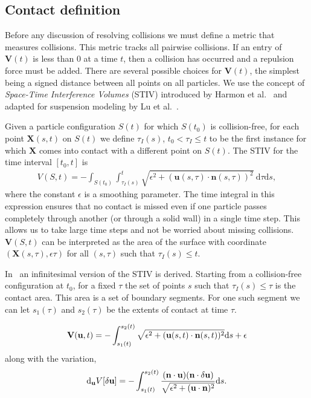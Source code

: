 \documentclass[preprint, 10pt]{elsarticle}
\begin{document}
\subsection{Contact definition}

Before any discussion of resolving collisions we must define a metric
that measures collisions. This metric tracks all pairwise collisions. If
an entry of $\mathbf{V}(t)$ is less than 0 at a time $t$, then a
collision has occurred and a repulsion force must be added. There are
several possible choices for $\mathbf{V}(t)$, the simplest being a
signed distance between all points on all particles. We use the concept
of {\em Space-Time Interference Volumes} (STIV) introduced by Harmon et
al.~\cite{Harmon2011} and adapted for suspension modeling by Lu et
al.~\cite{Lu2017}. 

Given a particle configuration $S(t)$ for which $S(t_0)$ is
collision-free, for each point $\mathbf{X}(s,t)$ on $S(t)$ we define
$\tau_I(s)$, $t_0 < \tau_I \leq t$ to be the first instance for which
$\mathbf{X}$ comes into contact with a different point on $S(t)$. The
STIV for the time interval $[t_0, t]$ is 
\begin{align*}
    V(S, t) = -\int_{S(t_0)}\int_{\tau_I(s)}^t 
    \sqrt{\epsilon^2 + (\mathbf{u}(s, \tau) \cdot
    \mathbf{n}(s,\tau))^2}~\text{d}\tau\text{d}s,
\end{align*}
where the constant $\epsilon$ is a smoothing parameter. The time
integral in this expression ensures that no contact is missed even if
one particle passes completely through another (or through a solid wall)
in a single time step. This allows us to take large time steps and not
be worried about missing collisions. $\mathbf{V}(S,t)$ can be
interpreted as the area of the surface with coordinate
$(\mathbf{X}(s,\tau),\epsilon\tau)$ for all $(s,\tau)$ such that
$\tau_I(s)\leq t$. 

In~\cite{Lu2017} an infinitesimal version of the STIV is derived.
Starting from a collision-free configuration at $t_0$, for a fixed
$\tau$ the set of points $s$ such that $\tau_I(s)\leq \tau$ is the
contact area. This area is a set of boundary segments. For one such
segment we can let $s_1(\tau)$ and $s_2(\tau)$ be the extents of contact
at time $\tau$. 

\begin{align*}
  \mathbf{V}({\mathbf{u}},t) = -\int_{s_1(t)}^{s_2(t)} 
    \sqrt{\epsilon^2 + ({\mathbf{u}}(s,t)\cdot{\mathbf{n}}(s,t))^2}\text{d}s + \epsilon
\end{align*}
along with the variation, 
\begin{align*}
  \text{d}_{{\mathbf{u}}}V[\delta\mathbf{u}] = 
  -\int_{s_1(t)}^{s_2(t)} \frac{({\mathbf{n}}\cdot{\mathbf{u}})({\mathbf{n}}\cdot\delta{\mathbf{u}})}
  {\sqrt{\epsilon^2 + ({\mathbf{u}}\cdot{\mathbf{n}})^2}}\text{d}s.
\end{align*}
\end{document}
